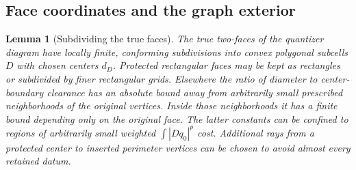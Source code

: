 \documentclass[11pt]{article}
\numberwithin{equation}{section}
\newtheorem{lemma}[theorem]{Lemma}
\theoremstyle{definition}
\theoremstyle{remark}
\begin{document}
\subsection{Face coordinates and the graph exterior}

\begin{lemma}[Subdividing the true faces]\label{qt:subdivision}
The true two-faces of the quantizer diagram have locally finite,
conforming subdivisions into convex polygonal subcells $D$ with
chosen centers $d_D$.  Protected rectangular faces may be kept as
rectangles or subdivided by finer rectangular grids.  Elsewhere the
ratio of diameter to center-boundary clearance has an absolute bound
away from arbitrarily small prescribed neighborhoods of the original
vertices.  Inside those neighborhoods it has a finite bound depending
only on the original face.  The latter constants can be confined to
regions of arbitrarily small weighted $\int|Dq_0|^p$ cost.  Additional
rays from a protected center to inserted perimeter vertices can be
chosen to avoid almost every retained datum.
\end{lemma}
\end{document}
